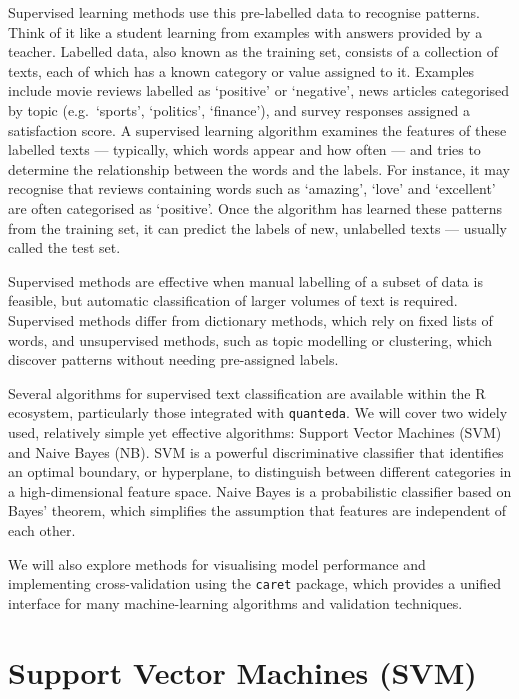\documentclass[
]{book}
\begin{document}
Supervised learning methods use this pre-labelled data to recognise patterns. Think of it like a student learning from examples with answers provided by a teacher. Labelled data, also known as the training set, consists of a collection of texts, each of which has a known category or value assigned to it. Examples include movie reviews labelled as `positive' or `negative', news articles categorised by topic (e.g.~`sports', `politics', `finance'), and survey responses assigned a satisfaction score. A supervised learning algorithm examines the features of these labelled texts --- typically, which words appear and how often --- and tries to determine the relationship between the words and the labels. For instance, it may recognise that reviews containing words such as `amazing', `love' and `excellent' are often categorised as `positive'. Once the algorithm has learned these patterns from the training set, it can predict the labels of new, unlabelled texts --- usually called the test set.

Supervised methods are effective when manual labelling of a subset of data is feasible, but automatic classification of larger volumes of text is required. Supervised methods differ from dictionary methods, which rely on fixed lists of words, and unsupervised methods, such as topic modelling or clustering, which discover patterns without needing pre-assigned labels.

Several algorithms for supervised text classification are available within the R ecosystem, particularly those integrated with \texttt{quanteda}. We will cover two widely used, relatively simple yet effective algorithms: Support Vector Machines (SVM) and Naive Bayes (NB). SVM is a powerful discriminative classifier that identifies an optimal boundary, or hyperplane, to distinguish between different categories in a high-dimensional feature space. Naive Bayes is a probabilistic classifier based on Bayes' theorem, which simplifies the assumption that features are independent of each other.

We will also explore methods for visualising model performance and implementing cross-validation using the \texttt{caret} package, which provides a unified interface for many machine-learning algorithms and validation techniques.

\section{Support Vector Machines (SVM)}\label{support-vector-machines-svm}
\end{document}
